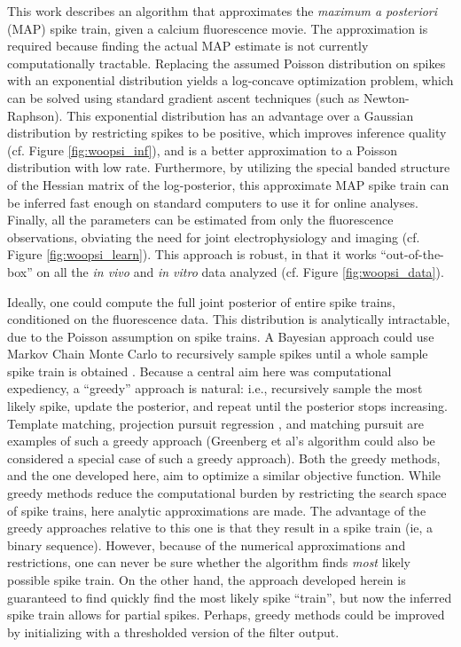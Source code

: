 This work describes an algorithm that approximates the \emph{maximum a posteriori} (MAP) spike train, given a calcium fluorescence movie.  The approximation is required because finding the actual MAP estimate is not currently computationally tractable.  Replacing the assumed Poisson distribution on spikes with an exponential distribution yields a log-concave optimization problem, which can be solved using standard gradient ascent techniques (such as Newton-Raphson).  This exponential distribution has an advantage over a Gaussian distribution by restricting spikes to be positive, which improves inference quality (cf. Figure \ref{fig:woopsi_inf}), and is a better approximation to a Poisson distribution with low rate.  %
Furthermore, by utilizing the special banded structure of the Hessian matrix of the log-posterior, this approximate MAP spike train can be inferred fast enough on standard computers to use it for online analyses.  Finally, all the parameters can be estimated from only the fluorescence observations, obviating the need for joint electrophysiology and imaging (cf. Figure \ref{fig:woopsi_learn}).  This approach is robust, in that it works ``out-of-the-box'' on all the \emph{in vivo} and \emph{in vitro} data analyzed (cf. Figure \ref{fig:woopsi_data}).

Ideally, one could compute the full joint posterior of entire spike trains, conditioned on the fluorescence data.  This distribution is analytically intractable, due to the Poisson assumption on spike trains.  A Bayesian approach could use Markov Chain Monte Carlo to recursively sample spikes until a whole sample spike train is obtained \cite{AndrieuDoucet01,MishchenkoPaninski09}.  Because a central aim here was computational expediency, a ``greedy'' approach is natural: i.e.,  recursively sample the most likely spike, update the posterior, and repeat until the posterior stops increasing.  Template matching, projection pursuit regression \cite{FS81}, and matching pursuit \cite{MallatZhang93} are examples of such a greedy approach (Greenberg et al's algorithm could also be considered a special case of such a greedy approach).  Both the greedy methods, and the one developed here, aim to optimize a similar objective function.  While greedy methods reduce the computational burden by restricting the search space of spike trains, here analytic approximations are made.  The advantage of the greedy approaches relative to this one is that they result in a spike train (ie, a binary sequence).  However, because of the numerical approximations and restrictions, one can never be sure whether the algorithm finds \emph{most} likely possible spike train.  On the other hand, the approach developed herein is guaranteed to find quickly find the most likely spike ``train'', but now the inferred spike train allows for partial spikes.  Perhaps, greedy methods could be improved by initializing with a thresholded version of the \foopsi filter output.  



